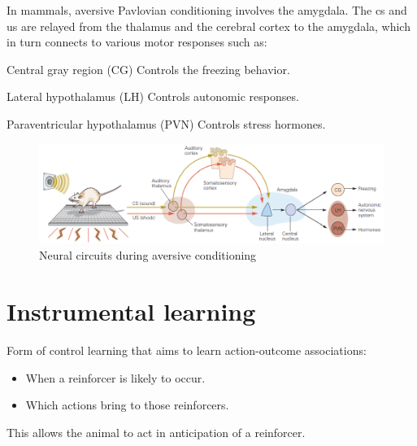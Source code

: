 \begin{remark} 
    In mammals, aversive Pavlovian conditioning involves the amygdala.
    The \ac{cs} and \ac{us} are relayed from the thalamus and the cerebral cortex to the amygdala, 
    which in turn connects to various motor responses such as:
    \begin{descriptionlist}
        \item[Central gray region (CG)] Controls the freezing behavior.
        \item[Lateral hypothalamus (LH)] Controls autonomic responses.
        \item[Paraventricular hypothalamus (PVN)] Controls stress hormones.
    \end{descriptionlist}

    \begin{figure}[H]
        \centering
        \includegraphics[width=0.9\linewidth]{./img/amygdala_pavlovian.png}
        \caption{Neural circuits during aversive conditioning}
    \end{figure}
\end{remark}



\section{Instrumental learning}

Form of control learning that aims to learn action-outcome associations:
\begin{itemize}
    \item When a reinforcer is likely to occur.
    \item Which actions bring to those reinforcers.
\end{itemize}
This allows the animal to act in anticipation of a reinforcer.

